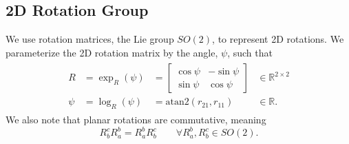 
\subsection{2D Rotation Group}
We use rotation matrices, the Lie group $SO(2)$, to represent 2D rotations.
We parameterize the 2D rotation matrix by the angle, $\psi$, such that
\begin{align}
  \begin{array}{llll}
    R &= \exp_R \left( \psi \right) &=
  \begin{bmatrix}
    \cos \psi & - \sin \psi \\
    \sin \psi & \cos \psi
  \end{bmatrix} & \in \mathbb{R}^{2 \times 2} \\
    \psi &= \log_R \left( \psi \right) &= \mathrm{atan2} \left(r_{21},r_{11}
      \right) & \in \mathbb{R}.
  \end{array}
\end{align}
We also note that planar rotations are commutative, meaning
\begin{equation}
  R_b^c R_a^b = R_a^b R_b^c \qquad \forall R_a^b, R_b^c \in SO(2).
\end{equation}


